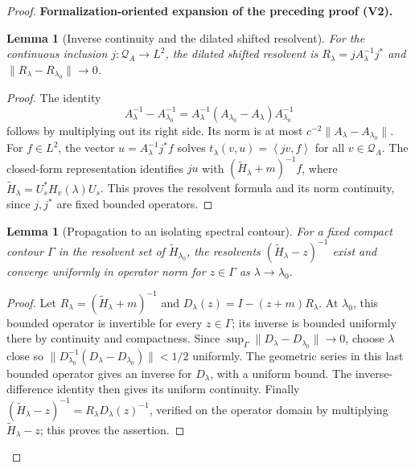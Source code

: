\documentclass[11pt]{article}
\newtheorem{lemma}[theorem]{Lemma}
\newcommand{\formalisationparentid}{X}
\newenvironment{formalisationaddition}[1]{\par\medskip\begingroup\color{blue}\def\formalisationparentid{#1}\setcounter{formalizationsublemma}{0}\let\lemma\formalizationsublemma\let\endlemma\endformalizationsublemma
  \def\Eo{\mathcal E_h^\circ}\def\EE{\mathcal E_h}\def\phio{\phi_h^\circ}\def\phih{\phi_h}\def\Ho{H_h^{\rm atom}(v^\circ)}\def\Ha{H_h^{\rm atom}}\def\HL{H_h^{L}}\def\Dh{D_h}\def\Log{\operatorname{Log}}\def\ellh{\ell_h}\def\Gp{G_{p,h}}\def\Ast{A_{*,h}}\def\ahat{\widehat{\mathfrak a}_h}\def\ah{\mathfrak a_h}\def\rh{\widehat\rho_h}\def\deltah{\widehat\delta_h}\def\oldref##1{\textup{(##1)}}\def\interface##1{\par\noindent\textit{Analytical interface used here.} ##1\par}\def\finish{\par\noindent\textit{Conclusion of the formalization-oriented expansion.} }\par\noindent\textbf{Formalization-oriented expansion of the preceding proof (V2).}\par\smallskip
}{\par\endgroup\medskip
}
\newcommand{\ip}[2]{\left\langle #1,#2\right\rangle}
\begin{document}
\begin{proof}
\begin{formalisationaddition}{L8.6}
\begin{lemma}[Inverse continuity and the dilated shifted resolvent]\label{sublemma:L8-6-form-resolvent}
For the continuous inclusion $j:\mathcal Q_A\to L^2$, the dilated
shifted resolvent is $R_\lambda=jA_\lambda^{-1}j^*$ and
$\|R_\lambda-R_{\lambda_0}\|\to0$.
\end{lemma}
\begin{proof}
The identity
\[
 A_\lambda^{-1}-A_{\lambda_0}^{-1}
 =A_\lambda^{-1}(A_{\lambda_0}-A_\lambda)A_{\lambda_0}^{-1}
\]
follows by multiplying out its right side. Its norm is at most
$c^{-2}\|A_\lambda-A_{\lambda_0}\|$.
For $f\in L^2$, the vector $u=A_\lambda^{-1}j^*f$ solves
$t_\lambda(v,u)=\ip{jv}f$ for all $v\in\mathcal Q_A$.
The closed-form representation identifies $ju$ with
$(\widetilde H_\lambda+m)^{-1}f$, where
$\widetilde H_\lambda=U_s^*H_v(\lambda)U_s$.
This proves the resolvent formula and its norm continuity, since
$j,j^*$ are fixed bounded operators.
\end{proof}

\begin{lemma}[Propagation to an isolating spectral contour]\label{sublemma:L8-6-contour-resolvent}
For a fixed compact contour $\Gamma$ in the resolvent set of
$\widetilde H_{\lambda_0}$, the resolvents
$(\widetilde H_\lambda-z)^{-1}$ exist and converge uniformly in
operator norm for $z\in\Gamma$ as $\lambda\to\lambda_0$.
\end{lemma}
\begin{proof}
Let $R_\lambda=(\widetilde H_\lambda+m)^{-1}$ and
$D_\lambda(z)=I-(z+m)R_\lambda$.
At $\lambda_0$, this bounded operator is invertible for every
$z\in\Gamma$; its inverse is bounded uniformly there by continuity
and compactness. Since
$\sup_\Gamma\|D_\lambda-D_{\lambda_0}\|\to0$, choose $\lambda$
close so
$\|D_{\lambda_0}^{-1}(D_\lambda-D_{\lambda_0})\|<1/2$ uniformly.
The geometric series in this last bounded operator gives an inverse
for $D_\lambda$, with a uniform bound. The inverse-difference identity
then gives its uniform continuity.
Finally
$(\widetilde H_\lambda-z)^{-1}=R_\lambda D_\lambda(z)^{-1}$,
verified on the operator domain by multiplying
$\widetilde H_\lambda-z$; this proves the assertion.
\end{proof}


\end{formalisationaddition}
\end{proof}
\end{document}
